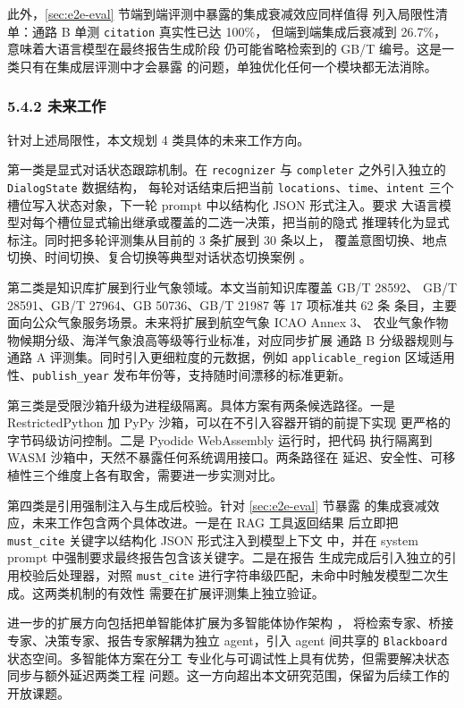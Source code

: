 此外，\ref{sec:e2e-eval} 节端到端评测中暴露的集成衰减效应同样值得
列入局限性清单：通路 B 单测 \texttt{citation} 真实性已达 100\%，
但端到端集成后衰减到 26.7\%，意味着大语言模型在最终报告生成阶段
仍可能省略检索到的 GB/T 编号。这是一类只有在集成层评测中才会暴露
的问题，单独优化任何一个模块都无法消除。

\subsubsection*{5.4.2 \quad 未来工作}

针对上述局限性，本文规划 4 类具体的未来工作方向。

第一类是显式对话状态跟踪机制。在 \texttt{recognizer} 与
\texttt{completer} 之外引入独立的 \texttt{DialogState} 数据结构，
每轮对话结束后把当前 \texttt{locations}、\texttt{time}、\texttt{intent}
三个槽位写入状态对象，下一轮 prompt 中以结构化 JSON 形式注入。要求
大语言模型对每个槽位显式输出继承或覆盖的二选一决策，把当前的隐式
推理转化为显式标注。同时把多轮评测集从目前的 3 条扩展到 30 条以上，
覆盖意图切换、地点切换、时间切换、复合切换等典型对话状态切换案例
\cite{ref29}。

第二类是知识库扩展到行业气象领域。本文当前知识库覆盖 GB/T 28592、
GB/T 28591、GB/T 27964、GB 50736、GB/T 21987 等 17 项标准共 62 条
条目，主要面向公众气象服务场景。未来将扩展到航空气象 ICAO Annex 3、
农业气象作物物候期分级、海洋气象浪高等级等行业标准，对应同步扩展
通路 B 分级器规则与通路 A 评测集。同时引入更细粒度的元数据，例如
\texttt{applicable\_\bk{}region} 区域适用性、\texttt{publish\_\bk{}year}
发布年份等，支持随时间漂移的标准更新。

第三类是受限沙箱升级为进程级隔离。具体方案有两条候选路径。一是
RestrictedPython 加 PyPy 沙箱，可以在不引入容器开销的前提下实现
更严格的字节码级访问控制。二是 Pyodide WebAssembly 运行时，把代码
执行隔离到 WASM 沙箱中，天然不暴露任何系统调用接口。两条路径在
延迟、安全性、可移植性三个维度上各有取舍，需要进一步实测对比。

第四类是引用强制注入与生成后校验。针对 \ref{sec:e2e-eval} 节暴露
的集成衰减效应，未来工作包含两个具体改进。一是在 RAG 工具返回结果
后立即把 \texttt{must\_\bk{}cite} 关键字以结构化 JSON 形式注入到模型上下文
中，并在 system prompt 中强制要求最终报告包含该关键字。二是在报告
生成完成后引入独立的引用校验后处理器，对照 \texttt{must\_\bk{}cite}
进行字符串级匹配，未命中时触发模型二次生成。这两类机制的有效性
需要在扩展评测集上独立验证。

进一步的扩展方向包括把单智能体扩展为多智能体协作架构 \cite{ref1, ref19}，
将检索专家、桥接专家、决策专家、报告专家解耦为独立 agent，引入
agent 间共享的 \texttt{Blackboard} 状态空间。多智能体方案在分工
专业化与可调试性上具有优势，但需要解决状态同步与额外延迟两类工程
问题。这一方向超出本文研究范围，保留为后续工作的开放课题。

